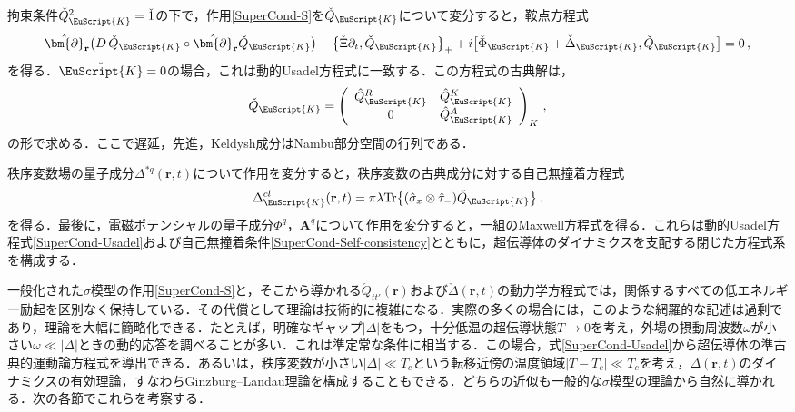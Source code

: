 \documentclass[a4paper,11pt]{ltjsarticle}
\def\Tr{\mathrm{Tr}}
\def\rt{(\mathbf{r},t)}
\begin{document}
拘束条件$\check{Q}_{\EuScript{K}}^{2}=\check{1}$の下で，作用\eqref{SuperCond-S}を$\check{Q}_{\EuScript{K}}$について変分すると，鞍点方程式
\begin{equation}\label{SuperCond-Usadel}
\hat{\bm{\partial}}_{\mathbf{r}}\big(D\,\check{Q}_{\EuScript{K}}\circ
\hat{\bm{\partial}}_{\mathbf{r}}\check{Q}_{\EuScript{K}}\big)-
\big\{\check{\Xi}\partial_{t},\check{Q}_{\EuScript{K}}\big\}_+ +
i\big[\check{\Phi}_{\EuScript{K}}+\check{\Delta}_{\EuScript{K}},
\check{Q}_{\EuScript{K}}\big]=0\,,
\end{equation}
を得る．$\check{\EuScript{K}}=0$の場合，これは動的Usadel方程式\cite{LarkinOvchinnikov}に一致する．この方程式の古典解は，
\begin{equation}
\check{Q}_{\EuScript{K}}=\left(\begin{array}{cc}\hat{Q}^{R}_{\EuScript{K}}
& \hat{Q}^{K}_{\EuScript{K}}
\\ 0 & \hat{Q}^{A}_{\EuScript{K}} \end{array}\right)_K\,,
\end{equation}
の形で求める．ここで遅延，先進，Keldysh成分はNambu部分空間の行列である．


秩序変数場の量子成分$\Delta^{*q}\rt$について作用を変分すると，秩序変数の古典成分に対する自己無撞着方程式
\begin{equation}\label{SuperCond-Self-consistency}
\Delta^{cl}_{\EuScript{K}}\rt=\pi\lambda
\Tr\big\{(\hat{\sigma}_{x}\otimes\hat{\tau}_{-})
\check{Q}_{\EuScript{K}}\big\}\,.
\end{equation}
を得る．最後に，電磁ポテンシャルの量子成分$\Phi^{q}$，$\mathbf{A}^{q}$について作用を変分すると，一組のMaxwell方程式を得る．これらは動的Usadel方程式\eqref{SuperCond-Usadel}および自己無撞着条件\eqref{SuperCond-Self-consistency}とともに，超伝導体のダイナミクスを支配する閉じた方程式系を構成する．


一般化された$\sigma$模型の作用\eqref{SuperCond-S}と，そこから導かれる$\check{Q}_{tt'}(\mathbf{r})$および$\check{\Delta}\rt$の動力学方程式では，関係するすべての低エネルギー励起を区別なく保持している．その代償として理論は技術的に複雑になる．実際の多くの場合には，このような網羅的な記述は過剰であり，理論を大幅に簡略化できる．たとえば，明確なギャップ$|\Delta|$をもつ，十分低温の超伝導状態$T\to0$を考え，外場の摂動周波数$\omega$が小さい$\omega\ll|\Delta|$ときの動的応答を調べることが多い．これは準定常な条件に相当する．この場合，式\eqref{SuperCond-Usadel}から超伝導体の準古典的運動論方程式を導出できる．あるいは，秩序変数が小さい$|\Delta|\ll T_c$という転移近傍の温度領域$|T-T_{c}|\ll T_{c}$を考え，$\Delta\rt$のダイナミクスの有効理論，すなわちGinzburg--Landau理論を構成することもできる．どちらの近似も一般的な$\sigma$模型の理論から自然に導かれる．次の各節でこれらを考察する．
\end{document}
